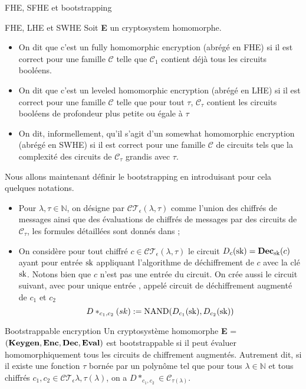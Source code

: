 \begin{section}{FHE, SFHE et bootstrapping}
\begin{definition}{FHE, LHE et SWHE}
Soit \textbf{E} un cryptosystem homomorphe.
\begin{itemize}
\item On dit que c'est un fully homomorphic encryption (abrégé en FHE) si il est correct pour
une famille $\mathcal{C}$ telle que $\mathcal{C_1}$ contient déjà tous les
circuits booléens. 
\item On dit que c'est un  leveled homomorphic encryption (abrégé en LHE)  si il est correct pour une famille
$\mathcal{C}$ telle que pour tout $\tau$, $\mathcal{C}_\tau$ contient les
circuits booléens de profondeur plus petite ou égale à $\tau$ 
\item On dit, informellement, qu'il s'agit d'un somewhat homomorphic encryption
(abrégé en SWHE) si il est correct pour une famille $\mathcal{C}$ de circuits
tels que la complexité des circuits de $\mathcal{C}_\tau$ grandis avec $\tau$.
\end{itemize}
\end{definition}

Nous allons maintenant définir le bootstrapping en introduisant pour cela
quelques notations.

\begin{itemize}
\item Pour $\lambda, \tau \in \mathbb{N}$, on désigne par
$\mathcal{CT}_\epsilon(\lambda,\tau)$ comme l'union des chiffrés de messages 
ainsi que des évaluations de chiffrés de messages par des circuits de
$\mathcal{C}_\tau$, les formules détaillées sont donnés dans \cite{halevi};
\item On considère pour tout chiffré $c\in\mathcal{CT}_\epsilon(\lambda,\tau)$ 
le circuit $D_c(\text{sk}) = \text{\textbf{Dec}}_{\text{sk}}(c)$ ayant pour entrée $\text{sk}$ appliquant 
l'algorithme de déchiffrement de $c$ avec la clé $\text{sk}$. Notons bien que $c$
n'est pas une entrée du circuit. On crée aussi le circuit suivant, avec pour
unique entrée \sk, appelé circuit de déchiffrement augmenté de $c_1$ et $c_2$
\[ D*_{c_1,c_2}(sk) := \text{NAND}(D_{c_1}(\text{sk}), D_{c_2}(\text{sk}))\]
\end{itemize}

\begin{definition}{Bootstrappable encryption}
Un cryptosystème homomorphe
\textbf{E} = $(\text{\textbf{Keygen}}, \text{\textbf{Enc}}, \text{\textbf{Dec}}, \text{\textbf{Eval}})$
est bootstrappable si il peut évaluer homomorphiquement tous les circuits 
de chiffrement augmentés. Autrement dit, si il existe une fonction $\tau$
bornée par un polynôme tel que pour tous $\lambda \in \mathbb{N}$ et tous
chiffrés  $c_1, c_2 \in \mathcal{CT}_\epsilon{\lambda, \tau(\lambda)}$, on a
$D*_{c_1,c_2} \in \mathcal{C}_{\tau(\lambda)}$.
\end{definition}


\end{section}
